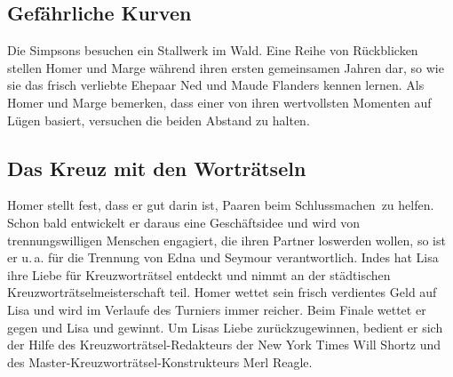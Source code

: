 
\subsection{Gefährliche Kurven}
Die Simpsons besuchen ein Stallwerk im Wald. Eine Reihe von Rückblicken stellen Homer und Marge während ihren ersten gemeinsamen Jahren dar, so wie sie das frisch verliebte Ehepaar Ned und Maude Flanders kennen lernen. Als Homer und Marge bemerken, dass einer von ihren wertvollsten Momenten auf Lügen basiert, versuchen die beiden Abstand zu halten. 


\subsection{Das Kreuz mit den Worträtseln}
Homer stellt fest, dass er gut darin ist, Paaren beim \glqq Schlussmachen\grqq\ zu helfen. Schon bald entwickelt er daraus eine Geschäftsidee und wird von trennungswilligen Menschen engagiert, die ihren Partner loswerden wollen, so ist er u.\,a. für die Trennung von Edna und Seymour verantwortlich. Indes hat Lisa ihre Liebe für Kreuzworträtsel entdeckt und nimmt an der städtischen Kreuzworträtselmeisterschaft teil. Homer wettet sein frisch verdientes Geld auf Lisa und wird im Verlaufe des Turniers immer reicher. Beim Finale wettet er gegen und Lisa und gewinnt. Um Lisas Liebe zurückzugewinnen, bedient er sich der Hilfe des Kreuzworträtsel-Redakteurs der New York Times Will Shortz und des Master-Kreuzworträtsel-Konstrukteurs Merl Reagle. 



